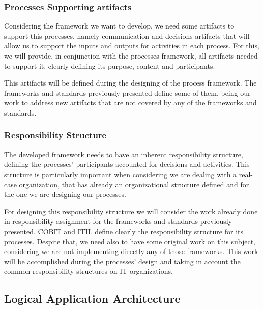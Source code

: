 \subsubsection{Processes Supporting artifacts}

Considering the framework we want to develop, we need some artifacts to support this processes, namely communication and decisions artifacts that will allow us to support the inputs and outputs for activities in each process. For this, we will provide, in conjunction with the processes framework, all artifacts needed to support it, clearly defining its purpose, content and participants.\par
This artifacts will be defined during the designing of the process framework. The frameworks and standards previously presented define some of them,  being our work to address new artifacts that are not covered by any of the frameworks and standards.\par

\subsubsection{Responsibility Structure}

The developed framework needs to have an inherent responsibility structure, defining the processes' participants accounted for decisions and activities. This structure is particularly important when considering we are dealing with a real-case organization, that has already an organizational structure defined and for the one we are designing our processes.\par
For designing this responsibility structure we will consider the work already done in responsibility assignment for the frameworks and standards previously presented. COBIT and ITIL define clearly the responsibility structure for its processes. Despite that, we need also to have some original work on this subject, considering we are not implementing directly any of those frameworks. This work will be accomplished during the processes' design and taking in account the common responsibility structures on IT organizations.\par 

\subsection{Logical Application Architecture}

